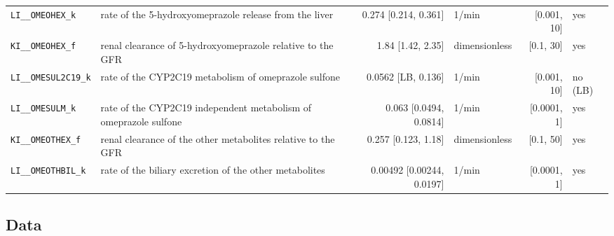 \begin{longtable}{llrlrl}
\texttt{LI\_\_OMEOHEX\_k} & rate of the 5-hydroxyomeprazole release from the liver & 0.274 [0.214, 0.361] & 1/min & [0.001, 10] & yes \\
\texttt{KI\_\_OMEOHEX\_f} & renal clearance of 5-hydroxyomeprazole relative to the GFR & 1.84 [1.42, 2.35] & dimensionless & [0.1, 30] & yes \\
\texttt{LI\_\_OMESUL2C19\_k} & rate of the CYP2C19 metabolism of omeprazole sulfone & 0.0562 [LB, 0.136] & 1/min & [0.001, 10] & no (LB) \\
\texttt{LI\_\_OMESULM\_k} & rate of the CYP2C19 independent metabolism of omeprazole sulfone & 0.063 [0.0494, 0.0814] & 1/min & [0.0001, 1] & yes \\
\texttt{KI\_\_OMEOTHEX\_f} & renal clearance of the other metabolites relative to the GFR & 0.257 [0.123, 1.18] & dimensionless & [0.1, 50] & yes \\
\texttt{LI\_\_OMEOTHBIL\_k} & rate of the biliary excretion of the other metabolites & 0.00492 [0.00244, 0.0197] & 1/min & [0.0001, 1] & yes \\
\end{longtable}

\subsection{Data}

